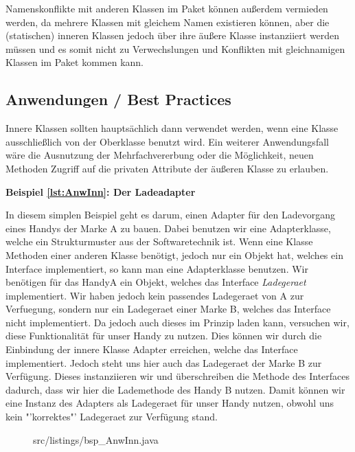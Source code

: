Namenskonflikte mit anderen Klassen im Paket können außerdem vermieden werden, da mehrere Klassen mit gleichem Namen existieren können, aber
die (statischen) inneren Klassen jedoch über ihre äußere Klasse instanziiert werden müssen und es somit nicht zu Verwechslungen und Konflikten mit gleichnamigen Klassen im Paket kommen kann.

\subsection{Anwendungen / Best Practices}

Innere Klassen sollten hauptsächlich dann verwendet werden, wenn eine Klasse ausschließlich von der Oberklasse benutzt wird.
Ein weiterer Anwendungsfall wäre die Ausnutzung der Mehrfachvererbung oder die Möglichkeit, neuen Methoden Zugriff auf die privaten Attribute der äußeren Klasse zu erlauben.

{\bf Beispiel \ref{lst:AnwInn}: Der Ladeadapter}

In diesem simplen Beispiel geht es darum, einen Adapter für den Ladevorgang eines Handys der Marke A zu bauen. Dabei benutzen wir eine Adapterklasse, welche ein Strukturmuster aus der Softwaretechnik ist. Wenn eine Klasse Methoden einer anderen Klasse benötigt, jedoch nur ein Objekt hat, welches ein Interface implementiert, so kann man eine Adapterklasse benutzen.
Wir benötigen für das HandyA ein Objekt, welches das Interface {\it Ladegeraet} implementiert.
Wir haben jedoch kein passendes Ladegeraet von A zur Verfuegung, sondern nur ein Ladegeraet einer Marke B, welches das Interface nicht implementiert.
Da jedoch auch dieses im Prinzip laden kann, versuchen wir, diese Funktionalität für unser Handy zu nutzen.
Dies können wir durch die Einbindung der innere Klasse Adapter erreichen, welche das Interface implementiert.
Jedoch steht uns hier auch das Ladegeraet der Marke B zur Verfügung.
Dieses instanziieren wir und überschreiben die Methode des Interfaces dadurch, dass wir hier die Lademethode des Handy B nutzen.
Damit können wir eine Instanz des Adapters als Ladegeraet für unser Handy nutzen, obwohl uns kein "'korrektes"' Ladegeraet zur Verfügung stand.
\\
\begin{figure}[hb]
\lstset{language=Java}
 {src/listings/bsp_AnwInn.java}
\end{figure}


\newpage
